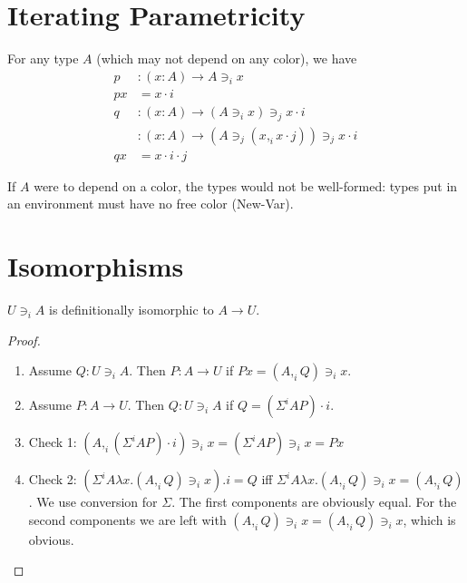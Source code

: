 \documentclass[english]{PaperTools/latex/lipics}
\newcommand\CP[3]{(#2,_{#1} #3)}
\newcommand\CSig[1]{\Sigma^{#1}}
\newcommand\param[1]{\!\cdot\!#1}
\newcommand\op[1]{∋_{#1}}
\begin{document}
\section{Iterating Parametricity}
For any type $A$ (which may not depend on any color), we have
\begin{align*}
p &: (x:A) → A \op i x\\
p x &= x\param i\\
q &: (x:A) → (A \op i x) \op j x \param  i\\
  &: (x:A) → (A \op j \CP i x {x \param j}) \op j x \param  i\\
q x &= x\param i\param j
\end{align*}

If $A$ were to depend on a color, the types would not be well-formed:
types put in an environment must have no free color ({\sc New-Var}).

\section{Isomorphisms}


\begin{theorem}
$U \op i A$ is definitionally isomorphic to $A → U$.
\end{theorem}
\begin{proof}~
  \begin{enumerate}
  \item Assume $Q : U \op i A$. Then $P : A → U$ if $P x = \CP i A Q \op i x$.
  \item Assume $P : A → U$. Then $Q : U \op i A$ if $Q = (\CSig i A P) \param i$.
  \item Check 1: $\CP i A {(\CSig i A P) \param i} \op i x = (\CSig i A P) \op i x = P x$
  \item Check 2: $(\CSig i A {λx. \CP i A Q \op i x}).i = Q$ iff $\CSig i A {λx. \CP i A Q \op i x} = \CP i A Q$. We use conversion for $\Sigma$. The first components are obviously equal. For the second components we are left with $\CP i A Q \op i x = \CP i A Q \op i x$, which is obvious.
  \end{enumerate}
\end{proof}
\end{document}
